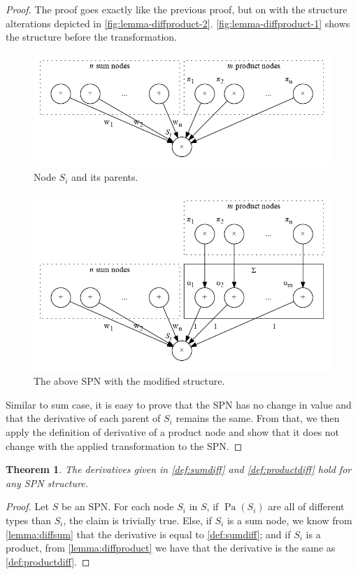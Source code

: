 \documentclass{amsart}
\DeclareMathOperator*{\Pa}{\text{Pa}}
\theoremstyle{plain}
\newcounter{dummy-def}\numberwithin{dummy-def}{section}
\newcounter{dummy-thm}\numberwithin{dummy-thm}{section}
\newtheorem{theorem}[dummy-thm]{Theorem}
\newcounter{dummy-prop}\numberwithin{dummy-prop}{section}
\newcounter{dummy-corollary}\numberwithin{dummy-corollary}{section}
\newcounter{dummy-lemma}\numberwithin{dummy-lemma}{section}
\newcounter{dummy-ex}\numberwithin{dummy-ex}{section}
\newcounter{dummy-eg}\numberwithin{dummy-eg}{section}
\numberwithin{equation}{section}
\begin{document}
\begin{proof}
  The proof goes exactly like the previous proof, but on with the structure alterations depicted in
  \autoref{fig:lemma-diffproduct-2}. \autoref{fig:lemma-diffproduct-1} shows the structure before
  the transformation.
  \begin{figure}[h]
    \centering\includegraphics[scale=0.5]{graphs/lemma-diffproduct-1.png}
    \caption{Node $S_i$ and its parents.}\label{fig:lemma-diffproduct-1}
  \end{figure}
  \begin{figure}[h]
    \centering\includegraphics[scale=0.5]{graphs/lemma-diffproduct-2.png}
    \caption{The above SPN with the modified structure.}\label{fig:lemma-diffproduct-2}
  \end{figure}
  Similar to sum case, it is easy to prove that the SPN has no change in value and that the
  derivative of each parent of $S_i$ remains the same. From that, we then apply the definition of
  derivative of a product node and show that it does not change with the applied transformation to
  the SPN\@.
\end{proof}

\begin{theorem} The derivatives given in \autoref{def:sumdiff} and \autoref{def:productdiff}
  hold for any SPN structure.
\end{theorem}
\begin{proof}
  Let $S$ be an SPN\@. For each node $S_i$ in $S$, if $\Pa(S_i)$ are all of different types than
  $S_i$, the claim is trivially true. Else, if $S_i$ is a sum node, we know from
  \autoref{lemma:diffsum} that the derivative is equal to \autoref{def:sumdiff}; and if $S_i$ is a
  product, from \autoref{lemma:diffproduct} we have that the derivative is the same as
  \autoref{def:productdiff}.
\end{proof}
\end{document}
